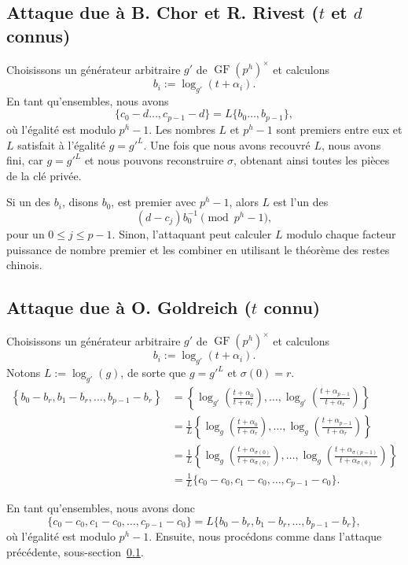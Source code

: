 \documentclass[a4paper, titlepage]{article}
\theoremstyle{definition}
\theoremstyle{remark}
\def\gf{\operatorname{GF}}
\begin{document}
\subsection{Attaque due à B. Chor et R. Rivest ($t$ et $d$ connus)}\label{attaqueTDconnus}

Choisissons un générateur arbitraire $g'$ de $\gf(p^h)^\times$ et calculons $$b_i := \log_{g'}(t+\alpha_i).$$
En tant qu'ensembles, nous avons
$$\{c_0 - d \dots, c_{p-1} -d\} = L\{b_0 \dots, b_{p-1}\},$$
où l'égalité est modulo $p^h -1$. Les nombres $L$ et $p^h-1$ sont premiers entre eux et $L$ satisfait à l'égalité $g = g'^L$. Une fois que nous avons recouvré $L$, nous avons fini, car $g=g'^L$ et nous pouvons reconstruire $\sigma$, obtenant ainsi toutes les pièces de la clé privée.

Si un des $b_i$, disons $b_0$, est premier avec $p^h-1$, alors $L$ est l'un des $$(d-c_j)b_0^{-1} \pmod{p^h-1},$$ pour un $0 \leqslant j \leqslant p-1$. Sinon, l'attaquant peut calculer $L$ modulo chaque facteur puissance de nombre premier et les combiner en utilisant le théorème des restes chinois.

\subsection{Attaque due à O. Goldreich ($t$ connu)} \label{attaqueOG}

Choisissons un générateur arbitraire $g'$ de $\gf(p^h)^\times$ et calculons $$b_i := \log_{g'}(t+\alpha_i).$$
Notons $L := \log_{g'}(g)$, de sorte que $g=g'^L$ et $\sigma(0) = r$.
\begin{align*}
\left\{b_0 - b_r, b_1 - b_r, \dots, b_{p-1} - b_r\right\} &= \left\{\log_{g'}\left(\frac{t+\alpha_0}{t+\alpha_r}\right), \dots, \log_{g'}\left(\frac{t+\alpha_{p-1}}{t+\alpha_r}\right)\right\} \\
&= \frac{1}{L}\left\{\log_{g}\left(\frac{t+\alpha_0}{t+\alpha_r}\right), \dots, \log_{g}\left(\frac{t+\alpha_{p-1}}{t+\alpha_r}\right)\right\} \\
&= \frac{1}{L}\left\{\log_{g}\left(\frac{t+\alpha_{\sigma(0)}}{t+\alpha_{\sigma(0)}}\right), \dots, \log_{g}\left(\frac{t+\alpha_{\sigma(p-1)}}{t+\alpha_{\sigma(0)}}\right)\right\} \\
&= \frac{1}{L}\{c_0 - c_0, c_1 - c_0, \dots, c_{p-1} -c_0\}.
\end{align*}

En tant qu'ensembles, nous avons donc
$$\{c_0 - c_0, c_1 - c_0, \dots, c_{p-1} -c_0\} = L\{b_0 - b_r, b_1 - b_r, \dots, b_{p-1} - b_r\},$$
où l'égalité est modulo $p^h -1$. Ensuite, nous procédons comme dans l'attaque précédente, sous-section~\ref{attaqueTDconnus}.
 
\end{document}
